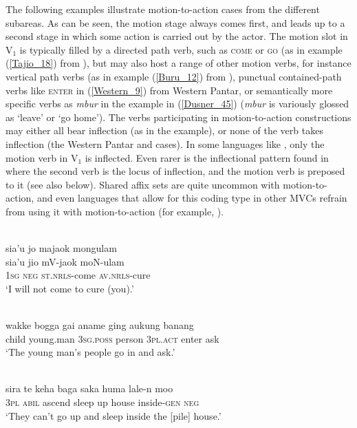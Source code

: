 The following examples illustrate motion-to-action cases from the different subareas. As can be seen, the motion stage always comes first, and leads up to a second stage in which some action is carried out by the actor. The motion slot in V$_1$ is typically filled by a directed path verb, such as \textsc{come} or \textsc{go} (as in example (\ref{Tajio_18}) from ), but may also host a range of other motion verbs, for instance vertical path verbs (as in example (\ref{Buru_12}) from ), punctual contained-path verbs like \textsc{enter} in (\ref{Western_9}) from Western Pantar, or semantically more specific verbs as \textit{mbur} in the  example in (\ref{Dusner_45}) (\textit{mbur} is variously glossed as `leave' or `go home'). The verbs participating in motion-to-action constructions may either all bear inflection (as in the  example), or none of the verb takes inflection (the Western Pantar and  cases). In some languages like , only the motion verb in V$_1$ is inflected. Even rarer is the inflectional pattern found in  where the second verb is the locus of inflection, and the motion verb is preposed to it (see also below). Shared affix sets are quite uncommon with motion-to-action, and even languages that allow for this coding type in other MVCs refrain from using it with motion-to-action (for example, ).

\ea \label{Tajio_18}
\\
\glll sia’u jo majaok mongulam \\
sia’u jio mV-jaok moN-ulam \\
1\textsc{sg} \textsc{neg} \textsc{st}.\textsc{nrls}-come \textsc{av}.\textsc{nrls}-cure \\
\glft `I will not come to cure (you).’\\ 
\z

\ea \label{Western_9}
\\
\gll wakke bogga gai aname ging aukung banang \\
child young.man 3\textsc{sg}.\textsc{poss} person 3\textsc{pl}.\textsc{act} enter ask \\
\glft `The young man's people go in and ask.'\\ 
\z

\ea \label{Buru_12}
\\
\gll sira te keha baga saka huma lale-n moo \\
3\textsc{pl} \textsc{abil} ascend sleep up house inside-\textsc{gen} \textsc{neg} \\
\glft `They can't go up and sleep inside the [pile] house.'\\ 
\z

